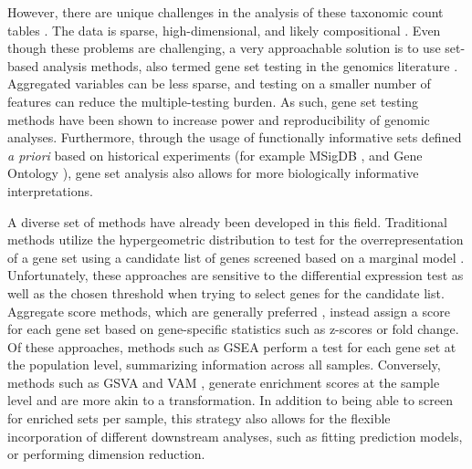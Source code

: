 \documentclass[10pt,letterpaper]{article}
\begin{document}
However, there are unique challenges in the analysis of these taxonomic count tables \cite{li2019a,li2015}. The data is sparse, high-dimensional, and likely compositional \cite{gloor2017, li2019a, li2015}. Even though these problems are challenging, a very approachable solution is to use set-based analysis methods, also termed gene set testing in the genomics literature \cite{khatri2012, goeman2007}. Aggregated variables can be less sparse, and testing on a smaller number of features can reduce the multiple-testing burden. As such, gene set testing methods have been shown to increase power and reproducibility of genomic analyses. Furthermore, through the usage of functionally informative sets defined \emph{a priori} based on historical experiments (for example MSigDB \cite{subramanian2005}, and Gene Ontology \cite{ashburner2000}), gene set analysis also allows for more biologically informative interpretations. 

A diverse set of methods have already been developed in this field. Traditional methods utilize the hypergeometric distribution to test for the overrepresentation of a gene set using a candidate list of genes screened based on a marginal model \cite{goeman2007}. Unfortunately, these approaches are sensitive to the differential expression test as well as the chosen threshold when trying to select genes for the candidate list. Aggregate score methods, which are generally preferred \cite{irizarry2009}, instead assign a score for each gene set based on gene-specific statistics such as z-scores or fold change. Of these approaches, methods such as GSEA \cite{subramanian2005} perform a test for each gene set at the population level, summarizing information across all samples. Conversely, methods such as GSVA \cite{hanzelmann2013} and VAM \cite{frost2020}, generate enrichment scores at the sample level and are more akin to a transformation. In addition to being able to screen for enriched sets per sample, this strategy also allows for the flexible incorporation of different downstream analyses, such as fitting prediction models, or performing dimension reduction.  

\end{document}

